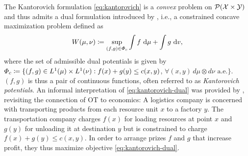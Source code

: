 The Kantorovich formulation \eqref{eq:kantorovich} is a \emph{convex} problem on ${\mathcal{P}}(\mathcal{X} \times \mathcal{Y})$ and thus admits a dual formulation introduced by \citet{kantorovich1942transfer}, i.e., a constrained concave maximization problem defined as
\begin{equation} \label{eq:kantorovich-dual}
    W(\mu, \nu)\coloneqq\sup _{(f, g) \in \Phi_{c}} \int f \mathrm{~d} \mu+\int g \mathrm{~d} v,
\end{equation}
 where the set of admissible dual potentials is given by $\Phi_c \coloneqq \{(f, g) \in L^{1}(\mu) \times L^{1}(\nu): f(x)+g(y) \leq c(x,y)$, $\forall(x, y)\, d\mu \otimes d\nu \text{ a.e.}\}$.
$(f, g)$ is thus a pair of continuous functions, often referred to as \emph{Kantorovich potentials}.
An informal interpretation of \eqref{eq:kantorovich-dual} was provided by \citet{caffarelli2003monge}, revisiting the connection of \acrshort{OT} to economics: 
A logistics company is concerned with transporting products from each resource unit $x$ to a factory $y$. The transportation company charges $f(x)$ for loading resources at point $x$ and $g(y)$ for unloading it at destination $y$ but is constrained to charge $f(x)+g(y) \le c(x,y)$. In order to arrange prizes $f$ and $g$ that increase profit, they thus maximize objective \eqref{eq:kantorovich-dual}.

